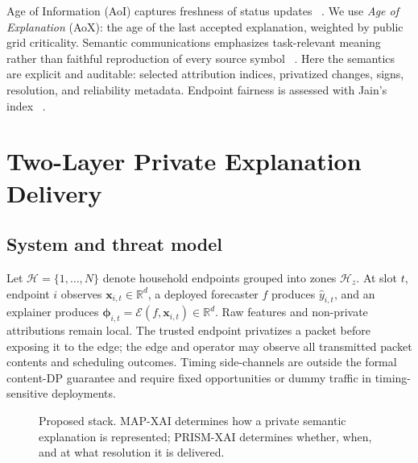 \documentclass[conference]{IEEEtran}
\newcommand{\method}{PRISM-XAI}
\newcommand{\mapxai}{MAP-XAI}
\begin{document}
Age of Information (AoI) captures freshness of status updates
~\cite{kaul2012aoi,yates2019aoi}. We use \emph{Age of Explanation}
(AoX): the age of the last accepted explanation, weighted by public grid
criticality. Semantic communications emphasizes task-relevant meaning
rather than faithful reproduction of every source symbol
~\cite{ma2023semantic}. Here the semantics are explicit and auditable:
selected attribution indices, privatized changes, signs, resolution, and
reliability metadata. Endpoint fairness is assessed with Jain's index
~\cite{jain1984fairness}.

\section{Two-Layer Private Explanation Delivery}

\subsection{System and threat model}

Let $\mathcal H=\{1,\ldots,N\}$ denote household endpoints grouped into
zones $\mathcal H_z$. At slot $t$, endpoint $i$ observes
$\bm x_{i,t}\in\mathbb R^d$, a deployed forecaster $f$ produces
$\hat y_{i,t}$, and an explainer produces
$\bm\phi_{i,t}=\mathcal E(f,\bm x_{i,t})\in\mathbb R^d$. Raw features and
non-private attributions remain local. The trusted endpoint privatizes a
packet before exposing it to the edge; the edge and operator may observe
all transmitted packet contents and scheduling outcomes. Timing
side-channels are outside the formal content-DP guarantee and require
fixed opportunities or dummy traffic in timing-sensitive deployments.

\begin{figure}[t]
\centering
{}
\caption{Proposed stack. \mapxai{} determines how a private semantic
explanation is represented; \method{} determines whether, when, and at
what resolution it is delivered.}
\label{fig:stack}
\end{figure}
\end{document}
